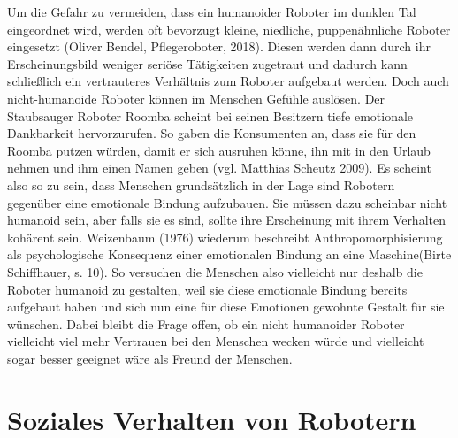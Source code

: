 \documentclass[12pt]{article}
\begin{document}
Um die Gefahr zu vermeiden, dass ein humanoider Roboter im dunklen Tal eingeordnet wird, werden oft bevorzugt kleine, niedliche, puppenähnliche Roboter eingesetzt (Oliver Bendel, Pflegeroboter, 2018). Diesen werden dann durch ihr Erscheinungsbild weniger seriöse Tätigkeiten zugetraut und dadurch kann schließlich ein vertrauteres Verhältnis zum Roboter aufgebaut werden.\newline
Doch auch nicht-humanoide Roboter können im Menschen Gefühle auslösen. Der Staubsauger Roboter Roomba scheint bei seinen Besitzern tiefe emotionale Dankbarkeit hervorzurufen. So gaben die Konsumenten an, dass sie für den Roomba putzen würden, damit er sich ausruhen könne, ihn mit in den Urlaub nehmen und ihm einen Namen geben (vgl. Matthias Scheutz 2009).\newline
Es scheint also so zu sein, dass Menschen grundsätzlich in der Lage sind Robotern gegenüber eine emotionale Bindung aufzubauen. Sie müssen dazu scheinbar nicht humanoid sein, aber falls sie es sind, sollte ihre Erscheinung mit ihrem Verhalten kohärent sein. \glqq Weizenbaum (1976) wiederum beschreibt Anthropomorphisierung als psychologische Konsequenz einer emotionalen Bindung an eine Maschine\grqq  (Birte Schiffhauer, s. 10). So versuchen die Menschen also vielleicht nur deshalb die Roboter humanoid zu gestalten, weil sie diese emotionale Bindung bereits aufgebaut haben und sich nun eine für diese Emotionen gewohnte Gestalt für sie wünschen. Dabei bleibt die Frage offen, ob ein nicht humanoider Roboter vielleicht viel mehr Vertrauen bei den Menschen wecken würde und vielleicht sogar besser geeignet wäre als Freund der Menschen.

 \section{Soziales Verhalten von Robotern}
 
\end{document}
